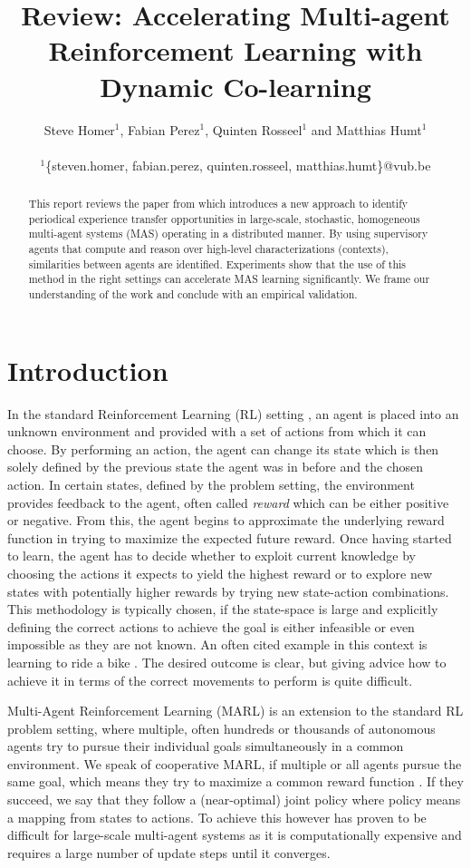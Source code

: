 \documentclass[letterpaper]{article}
\title{Review: Accelerating Multi-agent Reinforcement Learning
with Dynamic Co-learning}
\author{Steve Homer$^1$, Fabian Perez$^1$, Quinten Rosseel$^1$ and Matthias Humt$^1$ \\
\mbox{}\\
$^1$\{steven.homer, fabian.perez, quinten.rosseel, matthias.humt\}@vub.be}
\begin{document}
\maketitle

\begin{abstract} \label{sec:abstract}
 This report reviews the paper from \cite{garant2015accelerating} which introduces a new approach to identify periodical experience transfer opportunities in large-scale, stochastic, homogeneous multi-agent systems (MAS) operating in a distributed manner. By using supervisory agents that compute and reason over high-level characterizations (contexts), similarities between agents are identified. Experiments show that the use of this method in the right settings can accelerate MAS learning significantly. We frame our understanding of the work and conclude with an empirical validation.
\end{abstract}

\section{Introduction} \label{sec:introduction}
In the standard Reinforcement Learning (RL) setting \citep{sutton1998reinforcement}, an agent is placed into an unknown environment and provided with a set of actions from which it can choose. By performing an action, the agent can change its state which is then solely defined by the previous state the agent was in before and the chosen action. In certain states, defined by the problem setting, the environment provides feedback to the agent, often called \textit{reward} which can be either positive or negative. From this, the agent begins to approximate the underlying reward function in trying to maximize the expected future reward. Once having started to learn, the agent has to decide whether to exploit current knowledge by choosing the actions it expects to yield the highest reward or to explore new states with potentially higher rewards by trying new state-action combinations. This methodology is typically chosen, if the state-space is large and explicitly defining the correct actions to achieve the goal is either infeasible or even impossible as they are not known. An often cited example in this context is learning to ride a bike \citep{randlov1998learning}. The desired outcome is clear, but giving advice how to achieve it in terms of the correct movements to perform is quite difficult.

Multi-Agent Reinforcement Learning (MARL) is an extension to the standard RL problem setting, where multiple, often hundreds or thousands of autonomous agents try to pursue their individual goals simultaneously in a common environment. We speak of cooperative MARL, if multiple or all agents pursue the same goal, which means they try to maximize a common reward function \citep{tuyls2005evolutionary}. If they succeed, we say that they follow a (near-optimal) joint policy where policy means a mapping from states to actions. To achieve this however has proven to be difficult for large-scale multi-agent systems as it is computationally expensive and requires a large number of update steps until it converges.
\end{document}
